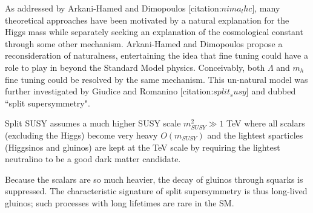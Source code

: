 As addressed by Arkani-Hamed and Dimopoulos [citation:$nima_lhc$], many theoretical approaches  have been
 motivated by a natural explanation for the Higgs mass while separately seeking an  explanation
 of the cosmological constant through some other mechanism.
Arkani-Hamed and Dimopoulos propose a reconsideration of naturalness, entertaining the idea that 
fine tuning could have a role to play in beyond the Standard Model physics.
Conceivably, both $\Lambda$ and $m_h$ fine tuning could be resolved by the same mechanism.  
This un-natural model was  further investigated by Giudice and Romanino [citation:$split_susy$]
and dubbed ``split supersymmetry". 

Split SUSY assumes a much higher SUSY scale $m_{SUSY}^2 \gg 1$ TeV where all scalars (excluding the Higgs) 
become very heavy $O(m_{SUSY})$ and the lightest sparticles (Higgsinos and gluinos) are kept at the TeV scale by requiring the lightest neutralino to be a good dark matter candidate. 

Because the scalars are so much heavier, the decay of gluinos through squarks is suppressed.
The characteristic signature of split supersymmetry is thus long-lived gluinos; such processes 
with long lifetimes are rare in the SM.
